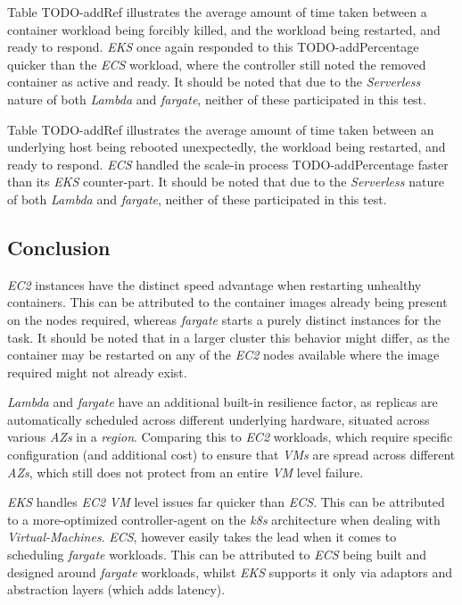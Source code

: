 Table TODO-addRef illustrates the average amount of time taken between a container workload being forcibly killed, and the workload being restarted, and ready to respond.
\textit{EKS} once again responded to this TODO-addPercentage quicker than the \textit{ECS} workload, where the controller still noted the removed container as active and ready.
It should be noted that due to the \textit{Serverless} nature of both \textit{Lambda} and \textit{fargate}, neither of these participated in this test.

Table TODO-addRef illustrates the average amount of time taken between an underlying host being rebooted unexpectedly, the workload being restarted, and ready to respond.
\textit{ECS} handled the scale-in process TODO-addPercentage faster than its \textit{EKS} counter-part.
It should be noted that due to the \textit{Serverless} nature of both \textit{Lambda} and \textit{fargate}, neither of these participated in this test.

\subsection*{Conclusion}
\textit{EC2} instances have the distinct speed advantage when restarting unhealthy containers.
This can be attributed to the container images already being present on the nodes required, whereas \textit{fargate} starts a purely distinct instances for the task.
It should be noted that in a larger cluster this behavior might differ, as the container may be restarted on any of the \textit{EC2} nodes available where the image required might not already exist.

\textit{Lambda} and \textit{fargate} have an additional built-in resilience factor, as replicas are automatically scheduled across different underlying hardware, situated across various \textit{AZs} in a \textit{region}.
Comparing this to \textit{EC2} workloads, which require specific configuration (and additional cost) to ensure that \textit{VMs} are spread across different \textit{AZs},
which still does not protect from an entire \textit{VM} level failure.

\textit{EKS} handles \textit{EC2} \textit{VM} level issues far quicker than \textit{ECS}. This can be attributed to a more-optimized controller-agent on the \textit{k8s} architecture when dealing with \textit{Virtual-Machines}.
\textit{ECS}, however easily takes the lead when it comes to scheduling \textit{fargate} workloads. This can be attributed to \textit{ECS} being built and designed around \textit{fargate} workloads, whilst \textit{EKS}
supports it only via adaptors and abstraction layers (which adds latency).


